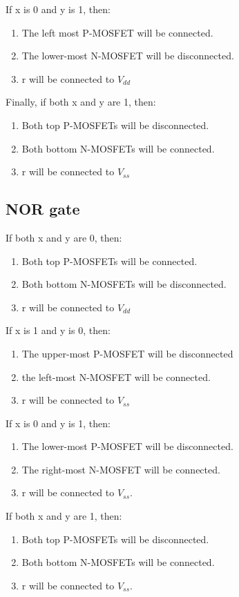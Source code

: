 \documentclass[11pt,a4paper,titlepage,dvipsnames,cmyk]{scrartcl}
\begin{document}
If x is 0 and y is 1, then:
\begin{enumerate}
    \item The left most P-MOSFET will be connected.
    \item The lower-most N-MOSFET will be disconnected.
    \item r will be connected to $V_{dd}$
\end{enumerate}

Finally, if both x and y are 1, then:
\begin{enumerate}
    \item Both top P-MOSFETs will be disconnected.
    \item Both bottom N-MOSFETs will be connected.
    \item r will be connected to $V_{ss}$
\end{enumerate}

\subsection{NOR gate}%
\label{sub:nor}
If both x and y are 0, then:
\begin{enumerate}
    \item Both top P-MOSFETs will be connected.
    \item Both bottom N-MOSFETs will be disconnected.
    \item r will be connected to $V_{dd}$
\end{enumerate}

If x is 1 and y is 0, then:
\begin{enumerate}
    \item The upper-most P-MOSFET will be disconnected
    \item the left-most N-MOSFET will be connected.
    \item r will be connected to $V_{ss}$
\end{enumerate}

If x is 0 and y is 1, then:
\begin{enumerate}
    \item The lower-most P-MOSFET will be disconnected.
    \item The right-most N-MOSFET will be connected.
    \item r will be connected to $V_{ss}$.
\end{enumerate}

If both x and y are 1, then:
\begin{enumerate}
    \item Both top P-MOSFETs will be disconnected.
    \item Both bottom N-MOSFETs will be connected.
    \item r will be connected to $V_{ss}$.
\end{enumerate}
\end{document}
